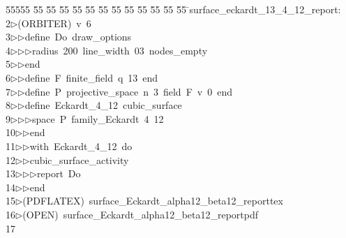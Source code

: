 %
%
\begin{tabbing}
55555 \= 55 \= 55 \= 55 \= 55 \= 55 \= 55 \= 55 \= 55 \= 55 \= 55 \= 55 \= 55 \= \>surface\_eckardt\_13\_4\_12\_report:\\[0pt]
2\>$\triangleright$\>(ORBITER)\ v\ 6\ \\[0pt]
3\>$\triangleright$\>$\triangleright$\>define\ Do\ draw\_options\ \\[0pt]
4\>$\triangleright$\>$\triangleright$\>$\triangleright$\>radius\ 200\ line\_width\ 03\ nodes\_empty\ \\[0pt]
5\>$\triangleright$\>$\triangleright$\>end\ \\[0pt]
6\>$\triangleright$\>$\triangleright$\>define\ F\ finite\_field\ q\ 13\ end\ \\[0pt]
7\>$\triangleright$\>$\triangleright$\>define\ P\ projective\_space\ n\ 3\ field\ F\ v\ 0\ end\ \\[0pt]
8\>$\triangleright$\>$\triangleright$\>define\ Eckardt\_4\_12\ cubic\_surface\ \\[0pt]
9\>$\triangleright$\>$\triangleright$\>$\triangleright$\>space\ P\ family\_Eckardt\ 4\ 12\ \\[0pt]
10\>$\triangleright$\>$\triangleright$\>end\ \\[0pt]
11\>$\triangleright$\>$\triangleright$\>with\ Eckardt\_4\_12\ do\ \\[0pt]
12\>$\triangleright$\>$\triangleright$\>cubic\_surface\_activity\ \\[0pt]
13\>$\triangleright$\>$\triangleright$\>$\triangleright$\>report\ Do\ \\[0pt]
14\>$\triangleright$\>$\triangleright$\>end\\[0pt]
15\>$\triangleright$\>(PDFLATEX)\ surface\_Eckardt\_alpha12\_beta12\_reporttex\\[0pt]
16\>$\triangleright$\>(OPEN)\ surface\_Eckardt\_alpha12\_beta12\_reportpdf\\[0pt]
17\>\end{tabbing}
